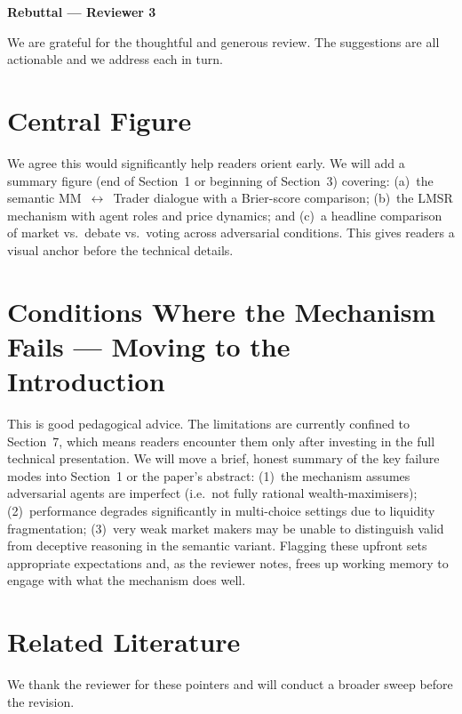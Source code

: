\documentclass[10pt]{article}
\begin{document}
\begin{center}
  {\large\bfseries Rebuttal --- Reviewer 3}
\end{center}

We are grateful for the thoughtful and generous review. The suggestions are
all actionable and we address each in turn.

\section*{Central Figure}

We agree this would significantly help readers orient early. We will add a
summary figure (end of Section~1 or beginning of Section~3) covering:
(a)~the semantic MM~$\leftrightarrow$~Trader dialogue with a Brier-score
comparison; (b)~the LMSR mechanism with agent roles and price dynamics; and
(c)~a headline comparison of market vs.\ debate vs.\ voting across adversarial
conditions. This gives readers a visual anchor before the technical details.

\section*{Conditions Where the Mechanism Fails --- Moving to the Introduction}

This is good pedagogical advice. The limitations are currently confined to
Section~7, which means readers encounter them only after investing in the full
technical presentation. We will move a brief, honest summary of the key failure
modes into Section~1 or the paper's abstract:
(1)~the mechanism assumes adversarial agents are imperfect (i.e.\ not fully
rational wealth-maximisers);
(2)~performance degrades significantly in multi-choice settings due to liquidity
fragmentation;
(3)~very weak market makers may be unable to distinguish valid from deceptive
reasoning in the semantic variant.
Flagging these upfront sets appropriate expectations and, as the reviewer notes,
frees up working memory to engage with what the mechanism does well.

\section*{Related Literature}

We thank the reviewer for these pointers and will conduct a broader sweep before
the revision.
\end{document}
